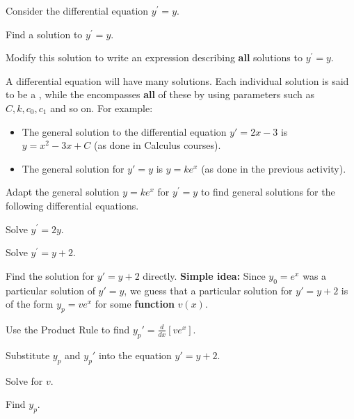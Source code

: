 \begin{applicationActivities}
\begin{activity}{15}
Consider the differential equation \(y^\prime=y\).
\begin{subactivity}
Find a solution to \(y^{\prime}=y\).
\end{subactivity}
\begin{subactivity}
Modify this solution to write an expression describing \textbf{all} solutions to \(y^{\prime}=y\).
\end{subactivity}
\end{activity}

\begin{definition}
A differential equation will have many solutions.
Each individual solution is said to be a ,
while the  encompasses \textbf{all} of these by using 
parameters such as \(C,k,c_0,c_1\) and so on. For example:

\begin{itemize}
\item The general solution to the differential equation \(y'=2x-3\) is \(y=x^2-3x+C\) (as done in
Calculus courses).
\item The general solution for \(y'=y\) is \(y=ke^x\) (as done in the previous activity). 
\end{itemize}

\end{definition}


\begin{activity}{15}
Adapt the general solution \(y=ke^x\) for \(y^\prime=y\) to find general solutions for
the following differential equations.
\begin{subactivity}
Solve \(y^{\prime}=2y\).
\end{subactivity}
\begin{subactivity}
Solve \(y^{\prime}=y+2\).
\end{subactivity}
\end{activity}

\begin{activity}{15}
Find the solution for \(y'=y+2\) directly.
\vfill
\textbf{Simple idea:} Since \(y_0=e^x\) was a particular solution of \(y'=y\), 
we guess that a particular solution for \(y'=y+2\) is of the form \(y_p =  v e^x\) 
for some \textbf{function} \(v(x)\). 
\vfill
\begin{subactivity}
Use the Product Rule to find \(y_p'=\frac{d}{dx}[ve^x]\).
\end{subactivity}
\begin{subactivity}
Substitute \(y_p\) and \(y_p'\) into the equation \(y'=y+2\).
\end{subactivity}
\begin{subactivity}
Solve for \(v\).
\end{subactivity}
\begin{subactivity}
Find \(y_p\).
\end{subactivity}
\end{activity}


\end{applicationActivities}

